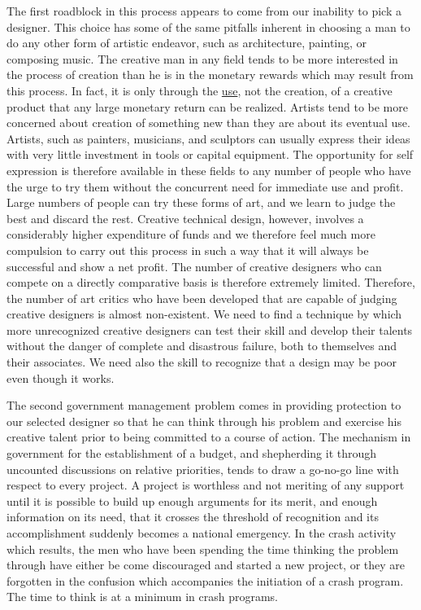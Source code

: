 \documentclass{memoir}
\begin{document}
The first roadblock in this process appears to come from our inability to pick a designer. This choice has some of the same pitfalls inherent in choosing a man to do any other form of artistic endeavor, such as architecture, painting, or composing music. The creative man in any field tends to be more interested in the process of creation than he is in the monetary rewards which may result from this process. In fact, it is only through the \underline{use}, not the creation, of a creative product that any large monetary return can be realized. Artists tend to be more concerned about creation of something new than they are about its eventual use. Artists, such as painters, musicians, and sculptors can usually express their ideas with very little investment in tools or capital equipment. The opportunity for self expression is therefore available in these fields to any number of people who have the urge to try them without the concurrent need for immediate use and profit. Large numbers of people can try these forms of art, and we learn to judge the best and discard the rest. Creative technical design, however, involves a considerably higher expenditure of funds and we therefore feel much more compulsion to carry out this process in such a way that it will always be successful and show a net profit. The number of creative designers who can compete on a directly comparative basis is therefore extremely limited. Therefore, the number of art critics who have been developed that are capable of judging creative designers is almost non-existent. We need to find a technique by which more unrecognized creative designers can test their skill and develop their talents without the danger of complete and disastrous failure, both to themselves and their associates. We need also the skill to recognize that a design may be poor even though it works.

The second government management problem comes in providing protection to our selected designer so that he can think through his problem and exercise his creative talent prior to being committed to a course of action. The mechanism in government for the establishment of a budget, and shepherding it through uncounted discussions on relative priorities, tends to draw a go-no-go line with respect to every project. A project is worthless and not meriting of any support until it is possible to build up enough arguments for its merit, and enough information on its need, that it crosses the threshold of recognition and its accomplishment suddenly becomes a national emergency. In the crash activity which results, the men who have been spending the time thinking the problem through have either be come discouraged and started a new project, or they are forgotten in the confusion which accompanies the initiation of a crash program. The time to think is at a minimum in crash programs.
\end{document}
